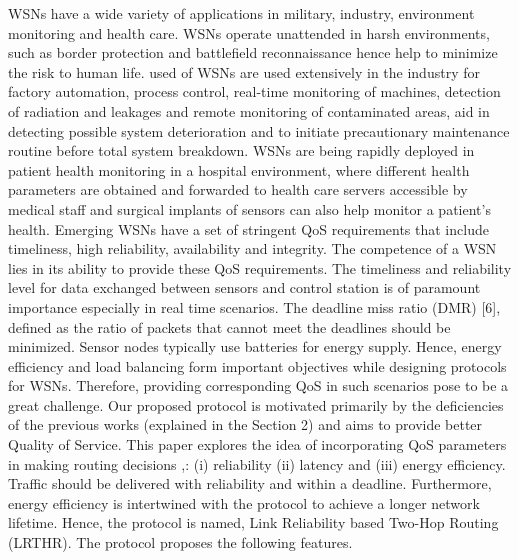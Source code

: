 \documentclass[fleqn,twoside]{article}
\begin{document}
\vskip 2mm
WSNs have a wide variety of applications in military, industry, environment monitoring and health care. WSNs operate unattended
in harsh environments, such as border protection and battlefield reconnaissance hence help to minimize the risk to human life.  used of WSNs are used extensively in the industry for factory automation, process control, real-time monitoring of machines, detection of radiation and leakages and remote monitoring of contaminated areas, aid in detecting possible system deterioration and to initiate precautionary maintenance routine before total system breakdown. WSNs are being rapidly deployed in patient health monitoring in a hospital environment, where different health parameters are obtained and forwarded to health care servers accessible by medical staff and surgical implants of sensors can also help monitor a patient’s health. 
\vskip 2mm
Emerging WSNs have a set of stringent QoS requirements that include timeliness, high reliability, availability and integrity. The competence of a WSN lies in its ability to provide these QoS requirements. The timeliness and reliability level for data exchanged between sensors and control station is of paramount importance especially in real time scenarios. The deadline miss ratio (DMR) [6], defined as the ratio of packets that cannot meet the deadlines should be minimized. Sensor nodes typically use batteries for energy supply. Hence, energy efficiency and load balancing form important objectives while designing protocols for WSNs. Therefore, providing corresponding QoS in such scenarios pose to be a great challenge. Our proposed protocol is motivated primarily by the deficiencies of the previous works (explained in the Section 2) and aims to provide better Quality of Service.
\vskip 2mm
This paper explores the idea of incorporating QoS parameters in making routing decisions ,: (i) reliability  (ii) latency and (iii) energy efficiency. Traffic should be delivered with reliability and within a deadline. Furthermore, energy efficiency is intertwined with the protocol to achieve a longer network lifetime. Hence, the protocol is named, Link Reliability based Two-Hop Routing (LRTHR). The protocol proposes the following features.
\end{document}
